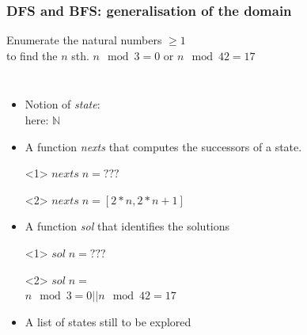 \begin{frame}[fragile]\frametitle{DFS and BFS: generalisation of the domain}

 Enumerate the natural numbers $\geq 1$\\
to find the $n$ sth. $n \mod 3 = 0$ or $n \mod 42 = 17$

\begin{columns}[t]

\begin{itemize}
\item Notion of \emph{state}:\\
  here: $\mathbb{N}$
\item A function \emph{nexts} that computes the successors of a state.\\
\begin{onlyenv}<1>
$nexts\; n = ???$
\end{onlyenv}
\begin{onlyenv}<2>
$nexts\; n = [2 * n, 2 * n +1 ]$
\end{onlyenv}
\item A function \emph{sol} that identifies the solutions\\
\begin{onlyenv}<1>
$sol\; n = ???$
\end{onlyenv}
\begin{onlyenv}<2>
  $sol\; n =$\\
  $n \mod 3 = 0 || n \mod 42 = 17$
\end{onlyenv}

\item A list of states still to be explored
\end{itemize}



\begin{center}

\end{center}
\end{columns}

\end{frame}

